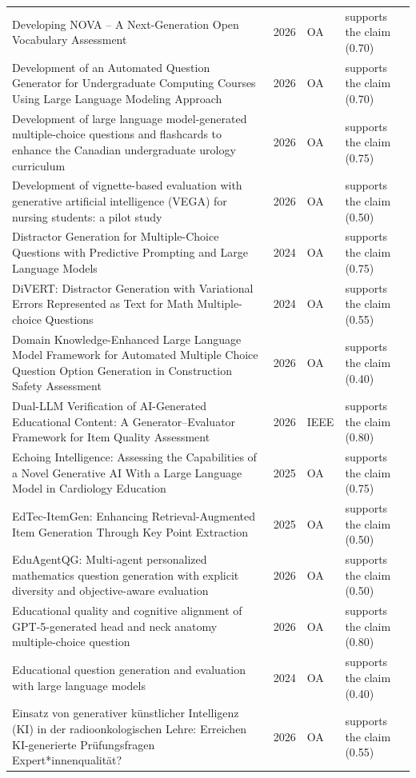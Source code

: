 \begin{longtable}{@{}%
  >{\raggedright\arraybackslash}p{}c%
  >{\raggedright\arraybackslash}p{}%
  >{\raggedright\arraybackslash}p{}@{}}
Developing NOVA -- A Next-Generation Open Vocabulary Assessment & 2026 & OA & supports the claim (0.70) \\
Development of an Automated Question Generator for Undergraduate Computing Courses Using Large Language Modeling Approach & 2026 & OA & supports the claim (0.70) \\
Development of large language model-generated multiple-choice questions and flashcards to enhance the Canadian undergraduate urology curriculum & 2026 & OA & supports the claim (0.75) \\
Development of vignette-based evaluation with generative artificial intelligence (VEGA) for nursing students: a pilot study & 2026 & OA & supports the claim (0.50) \\
Distractor Generation for Multiple-Choice Questions with Predictive Prompting and Large Language Models & 2024 & OA & supports the claim (0.75) \\
DiVERT: Distractor Generation with Variational Errors Represented as Text for Math Multiple-choice Questions & 2024 & OA & supports the claim (0.55) \\
Domain Knowledge-Enhanced Large Language Model Framework for Automated Multiple Choice Question Option Generation in Construction Safety Assessment & 2026 & OA & supports the claim (0.40) \\
Dual-LLM Verification of AI-Generated Educational Content: A Generator--Evaluator Framework for Item Quality Assessment & 2026 & IEEE & supports the claim (0.80) \\
Echoing Intelligence: Assessing the Capabilities of a Novel Generative AI With a Large Language Model in Cardiology Education & 2025 & OA & supports the claim (0.75) \\
EdTec-ItemGen: Enhancing Retrieval-Augmented Item Generation Through Key Point Extraction & 2025 & OA & supports the claim (0.50) \\
EduAgentQG: Multi-agent personalized mathematics question generation with explicit diversity and objective-aware evaluation & 2026 & OA & supports the claim (0.50) \\
Educational quality and cognitive alignment of GPT-5-generated head and neck anatomy multiple-choice question & 2026 & OA & supports the claim (0.80) \\
Educational question generation and evaluation with large language models & 2024 & OA & supports the claim (0.40) \\
Einsatz von generativer künstlicher Intelligenz (KI) in der radioonkologischen Lehre: Erreichen KI-generierte Prüfungsfragen Expert*innenqualität? & 2026 & OA & supports the claim (0.55) \\

\end{longtable}
